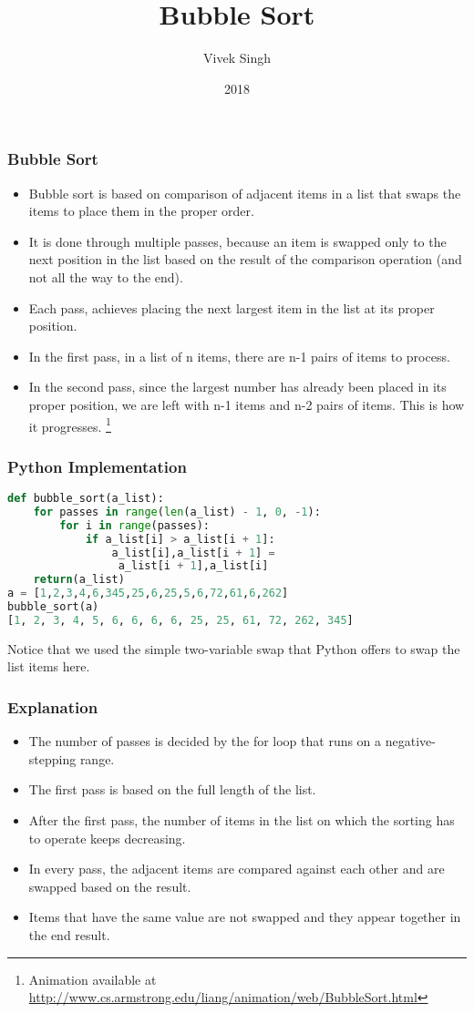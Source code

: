 \documentclass{beamer}
\title{Bubble Sort}
\author{Vivek Singh}
\institute{Information Systems Decision Sciences (ISDS)\\
MUMA College of Business\\
University of South Florida \\
Tampa, Florida}
\date{2018}
\begin{document}
\frame{\titlepage}

\begin{frame}
\frametitle{Bubble Sort}
\begin{itemize}
\item Bubble sort is based on comparison of adjacent items in a list that swaps the items to place them in the proper order.
\item It is done through multiple passes, because an item is swapped only to the next position in the list based on the result of the comparison operation (and not all the way to the end).
\item Each pass, achieves placing the next largest item in the list at its proper position.
\item In the first pass, in a list of n items, there are n-1 pairs of items to process.
\item In the second pass, since the largest number has already been placed in its proper  position, we are left with n-1 items and n-2 pairs of items. This is how it progresses.
\footnote{Animation available at \url{http://www.cs.armstrong.edu/liang/animation/web/BubbleSort.html}}
\end{itemize}
\end{frame}

\begin{frame}[fragile]
\frametitle{Python Implementation}
\begin{lstlisting}[language=Python]
def bubble_sort(a_list):
    for passes in range(len(a_list) - 1, 0, -1):
        for i in range(passes):
            if a_list[i] > a_list[i + 1]:
                a_list[i],a_list[i + 1] =
                 a_list[i + 1],a_list[i]
    return(a_list)
a = [1,2,3,4,6,345,25,6,25,5,6,72,61,6,262]
bubble_sort(a)
[1, 2, 3, 4, 5, 6, 6, 6, 6, 25, 25, 61, 72, 262, 345]
\end{lstlisting}
Notice that we used the simple two-variable swap that Python offers to swap the list items here.
\end{frame}

\begin{frame}
\frametitle{Explanation}
\begin{itemize}
\item The number of passes is decided by the for loop that runs on a negative-stepping range.
\item The first pass is based on the full length of the list.
\item After the first pass, the number of items in the list on which the sorting has to operate keeps decreasing.
\item In every pass, the adjacent items are compared against each other and are swapped based on the result.
\item Items that have the same value are not swapped and they appear together in the end result.
\end{itemize}
\end{frame}
\end{document}
